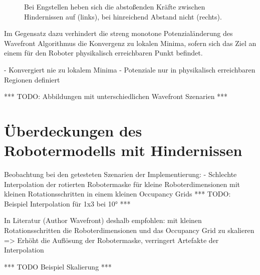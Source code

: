 \begin{figure}[h!]
\begin{minipage}{0.46\textwidth}
	\end{minipage}
	\hspace*{\fill}
	\label{fig:oscillation}
	\caption{Bei Engstellen heben sich die abstoßenden Kräfte zwischen Hindernissen auf (links), bei hinreichend Abstand nicht (rechts).}
\end{figure}


Im Gegensatz dazu verhindert die streng monotone Potenzialänderung des Wavefront Algorithmus die Konvergenz zu lokalen Minima, sofern sich das Ziel an einem für den Roboter physikalisch erreichbaren Punkt befindet.

	- Konvergiert nie zu lokalem Minima
	- Potenziale nur in physikalisch erreichbaren Regionen definiert

*** TODO: Abbildungen mit unterschiedlichen Wavefront Szenarien ***


\section{Überdeckungen des Robotermodells mit Hindernissen}

Beobachtung bei den getesteten Szenarien der Implementierung: 
- Schlechte Interpolation der rotierten Robotermaske für kleine Roboterdimensionen mit kleinen Rotationsschritten in einem kleinen Occupancy Grids
 *** TODO: Beispiel Interpolation für 1x3 bei 10° ***

In Literatur (Author Wavefront) deshalb empfohlen: mit kleinen Rotationsschritten die Roboterdimensionen und das Occupancy Grid zu skalieren
=> Erhöht die Auflösung der Robotermaske, verringert Artefakte der Interpolation

*** TODO Beispiel Skalierung ***